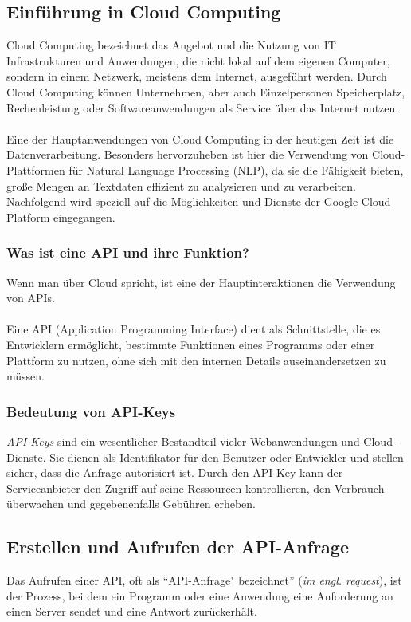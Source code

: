 \documentclass[12pt,a4paper]{article}
\begin{document}
\subsection{Einführung in Cloud Computing}
Cloud Computing bezeichnet das Angebot und die Nutzung von IT Infrastrukturen und Anwendungen, die nicht lokal auf dem eigenen Computer, sondern in einem Netzwerk, meistens dem Internet, ausgeführt werden. Durch Cloud Computing können Unternehmen, aber auch Einzelpersonen Speicherplatz, Rechenleistung oder Softwareanwendungen als Service über das Internet nutzen.
\\	\\
Eine der Hauptanwendungen von Cloud Computing in der heutigen Zeit ist die Datenverarbeitung. Besonders hervorzuheben ist hier die Verwendung von Cloud-Plattformen für Natural Language Processing (NLP), da sie die Fähigkeit bieten, große Mengen an Textdaten effizient zu analysieren und zu verarbeiten. Nachfolgend wird speziell auf die Möglichkeiten und Dienste der Google Cloud Platform eingegangen.
\subsubsection{Was ist eine API und ihre Funktion?}
Wenn man über Cloud spricht, ist eine der Hauptinteraktionen die Verwendung von APIs. 
\\ \\
Eine API (Application Programming Interface) dient als Schnittstelle, die es Entwicklern ermöglicht, bestimmte Funktionen eines Programms oder einer Plattform zu nutzen, ohne sich mit den internen Details auseinandersetzen zu müssen. 

\subsubsection{Bedeutung von API-Keys}
\textit{API-Keys} sind ein wesentlicher Bestandteil vieler Webanwendungen und Cloud-Dienste. Sie dienen als Identifikator für den Benutzer oder Entwickler und stellen sicher, dass die Anfrage autorisiert ist. Durch den API-Key kann der Serviceanbieter den Zugriff auf seine Ressourcen kontrollieren, den Verbrauch überwachen und gegebenenfalls Gebühren erheben.

\newpage
\subsection{Erstellen und Aufrufen der API-Anfrage}
Das Aufrufen einer API, oft als \enquote{API-Anfrage" bezeichnet} (\textit{im engl. request}), ist der Prozess, bei dem ein Programm oder eine Anwendung eine Anforderung an einen Server sendet und eine Antwort zurückerhält.
\end{document}
